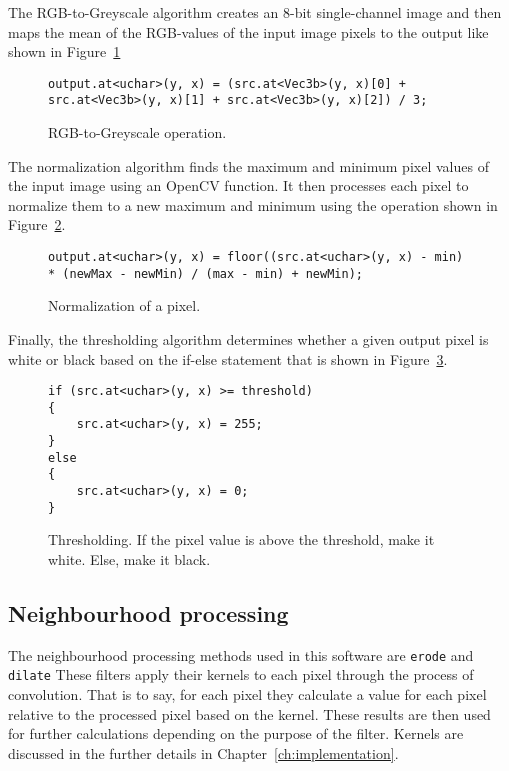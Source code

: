 The RGB-to-Greyscale algorithm creates an 8-bit single-channel image and then maps the mean of the RGB-values of the input image pixels to the output like shown in Figure~\ref{fig:rgb2gray}

\begin{figure}[!h]
\begin{lstlisting}
output.at<uchar>(y, x) = (src.at<Vec3b>(y, x)[0] + src.at<Vec3b>(y, x)[1] + src.at<Vec3b>(y, x)[2]) / 3;
\end{lstlisting}
\caption{RGB-to-Greyscale operation.\label{fig:rgb2gray}}
\end{figure}

The normalization algorithm finds the maximum and minimum pixel values of the input image using an OpenCV function. It then processes each pixel to normalize them to a new maximum and minimum using the operation shown in Figure~\ref{fig:normalize}.

\begin{figure}
\begin{lstlisting}
output.at<uchar>(y, x) = floor((src.at<uchar>(y, x) - min) * (newMax - newMin) / (max - min) + newMin);
\end{lstlisting}
\caption{Normalization of a pixel. \label{fig:normalize}}
\end{figure} 

Finally, the thresholding algorithm determines whether a given output pixel is white or black based on the if-else statement that is shown in Figure~\ref{fig:threshold}.

\begin{figure}
\begin{lstlisting}
if (src.at<uchar>(y, x) >= threshold)
{
	src.at<uchar>(y, x) = 255;
}
else
{
	src.at<uchar>(y, x) = 0;
}
\end{lstlisting}
\caption{Thresholding. If the pixel value is above the threshold, make it white. Else, make it black.\label{fig:threshold}}
\end{figure}

\subsection{Neighbourhood processing}
The neighbourhood processing methods used in this software are \texttt{erode} and \texttt{dilate} These filters apply their kernels to each pixel through the process of convolution. That is to say, for each pixel they calculate a value for each pixel relative to the processed pixel based on the kernel. These results are then used for further calculations depending on the purpose of the filter. Kernels are discussed in the further details in Chapter~\ref{ch:implementation}.	

